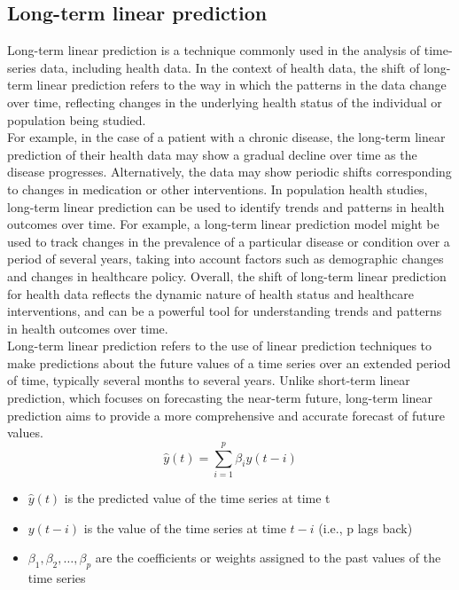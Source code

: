     \subsection{Long-term linear prediction} \label{subsec:longlp}
    Long-term linear prediction is a technique commonly used in the analysis of time-series data, including health data. In the context of health data,
    the shift of long-term linear prediction refers to the way in which the patterns in the data change over time, reflecting changes in the underlying
    health status of the individual or population being studied.\\
    For example, in the case of a patient with a chronic disease, the long-term linear prediction of their health data may show a gradual decline over
    time as the disease progresses. Alternatively, the data may show periodic shifts corresponding to changes in medication or other interventions.
    In population health studies, long-term linear prediction can be used to identify trends and patterns in health outcomes over time.
    For example, a long-term linear prediction model might be used to track changes in the prevalence of a particular disease or condition
    over a period of several years, taking into account factors such as demographic changes and changes in healthcare policy.
    Overall, the shift of long-term linear prediction for health data reflects the dynamic nature of health status and healthcare interventions,
    and can be a powerful tool for understanding trends and patterns in health outcomes over time.
\\
    Long-term linear prediction refers to the use of linear prediction techniques to make predictions about the future values of a time series
    over an extended period of time, typically several months to several years. Unlike short-term linear prediction, which focuses on forecasting the
    near-term future, long-term linear prediction aims to provide a more comprehensive and accurate forecast of future values.
    \begin{equation} \label{eq:ltlp}
        \hat{y}(t) = \sum_{i=1}^{p} \beta_i y(t-i)
    \end{equation}
    \begin{itemize}
        \item $\hat{y}(t)$ is the predicted value of the time series at time t
        \item $y(t-i)$ is the value of the time series at time $t-i$ (i.e., p lags back)
        \item $\beta_1, \beta_2, \dots, \beta_p$ are the coefficients or weights assigned to the past values of the time series
    \end{itemize}
    
